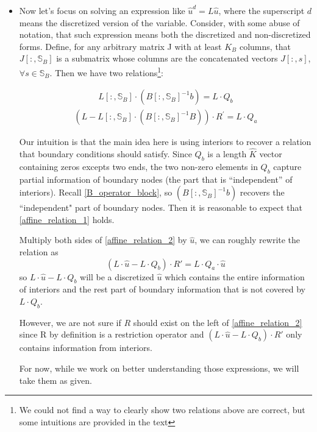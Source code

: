 \documentclass[11pt]{article}
\begin{document}
		\begin{itemize}
			\item Now let's focus on solving an expression like $\hat{u}^d = L \hat{u}$, where the superscript $d$ means the discretized version of the variable. Consider, with some abuse of notation, that such expression means both the discretized and non-discretized forms. Define, for any arbitrary matrix J with at least $K_B$ columns, that $J[:,\mathbb{S}_B]$ is a submatrix whose columns are the concatenated vectors $J[:,s]$, $\forall s \in \mathbb{S}_B$. 
			Then we have two relations\footnote{We could not find a way to clearly show two relations above are correct, but some intuitions are provided in the text}:
		
			\begin{align}
			L[:,\mathbb{S}_B] \cdot\left(B[:,\mathbb{S}_B]^{-1} b \right) = L\cdot Q_b\label{affine_relation_1}
			\end{align}
			\begin{align}
			(L-L[:,\mathbb{S}_B] \cdot(B[:,\mathbb{S}_B]^{-1} B))\cdot R^{'} = L\cdot Q_a\label{affine_relation_2}
			\end{align}		
		
			Our intuition is that the main idea here is using interiors to recover a relation that boundary conditions should satisfy. Since $Q_b$ is a length $\hat{K}$ vector containing zeros excepts two ends, the two non-zero elements in $Q_b$ capture partial information of boundary nodes (the part that is ``independent'' of interiors).  Recall \eqref{B_operator_block}, so $\left(B[:,\mathbb{S}_B]^{-1} b \right)$ recovers the ``independent" part of boundary nodes. Then it is reasonable to expect that \eqref{affine_relation_1} holds.
		
			Multiply both sides of \eqref{affine_relation_2} by $\hat{u}$, we can roughly rewrite the relation as
			\begin{equation}
			(L\cdot \hat{u}-L\cdot Q_b) \cdot R' = L\cdot Q_a\cdot \hat{u}
			\end{equation}
			so $L\cdot \hat{u}-L\cdot Q_b$ will be a discretized $\hat{u}$ which contains the entire information of interiors and the rest part of boundary information that is not covered by $L\cdot Q_b$. 
		
			However, we are not sure if $R$ should exist on the left of \eqref{affine_relation_2} since R by definition is a restriction operator and $(L\cdot \hat{u}-L\cdot Q_b)\cdot R'$ only contains information from interiors.
			\iffalse %
			Also the size of the LHS of \eqref{affine_relation_2} is $K\times \hat{K}$, but the size of the RHS is $\hat{I}\times I$ .
			\fi
			For now, while we work on better understanding those expressions, we will take them as given.
		

\end{itemize}
\end{document}
